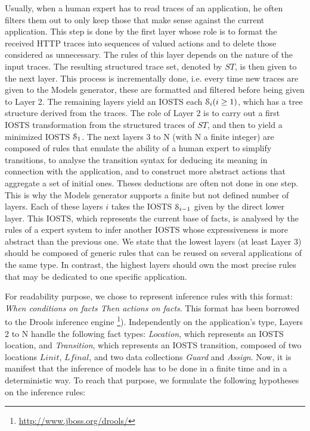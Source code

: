 Usually, when a human expert has to read traces of an
application, he often filters them out to only keep those that
make sense against the current application. This step is done by
the first layer whose role is to format the received HTTP traces
into sequences of valued actions and to delete those considered
as unnecessary. The rules of this layer depends on the nature of
the input traces. The resulting structured trace set, denoted by
$ST$, is then given to the next layer. This process is
incrementally done, i.e. every time new traces are given to the
Models generator, these are formatted and filtered before being
given to Layer 2. The remaining layers yield an IOSTS each
$\EuScript{S}_i (i\geq 1)$, which has a tree structure derived
from the traces. The role of Layer 2 is to carry out a first
IOSTS transformation from the structured traces of $ST$, and then
to yield a minimized IOSTS $\EuScript{S}_1$. The next layers
3 to N (with N a finite integer) are composed of rules that
emulate the ability of a human expert to simplify transitions, to
analyse the transition syntax for deducing its meaning in
connection with the application, and to construct more abstract
actions that aggregate a set of initial ones. Theses deductions
are often not done in one step. This is why the Models generator
supports a finite but not defined number of layers.  Each of
these layers $i$ takes the IOSTS $\EuScript{S}_{i-1}$ given by
the direct lower layer. This IOSTS, which represents the current
base of facts, is analysed by the rules of a expert system to
infer another IOSTS whose expressiveness is more abstract than
the previous one. We state that the lowest layers (at least Layer
3) should be composed of generic rules that can be reused on
several applications of the same type. In contrast, the highest
layers should own the most precise rules that may be dedicated to
one specific application.

For readability purpose, we chose to represent inference rules
with this format: \textit{When conditions on facts Then actions on
facts}. This format has been borrowed to the Drools inference
engine \footnote{\url{http://www.jboss.org/drools/}}). Independently
on the application's type, Layers 2 to N handle the following
fact types: \textit{Location}, which represents an IOSTS location,
and \textit{Transition}, which represents an IOSTS transition,
composed of two locations $Linit$, $Lfinal$, and two data
collections \textit{Guard} and \textit{Assign}. Now, it is
manifest that the inference of models has to be done in a finite
time and in a deterministic way. To reach that purpose, we
formulate the following hypotheses on the inference rules:

